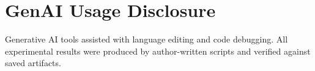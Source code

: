 \documentclass[sigconf,natbib=true]{acmart}
\begin{document}
\maketitle







\section*{GenAI Usage Disclosure}
Generative AI tools assisted with language editing and code debugging. All
experimental results were produced by author-written scripts and verified
against saved artifacts.

\begingroup
\sloppy
{}


\endgroup
\end{document}
